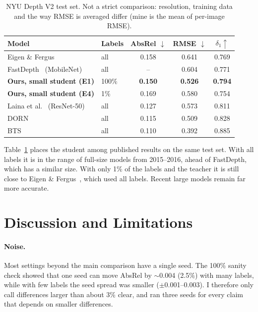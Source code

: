 \documentclass[11pt]{article}
\newcommand{\best}[1]{\textbf{#1}}
\begin{document}
\begin{table}[t]
\centering\small
\begin{tabular}{@{}llccc@{}}
\toprule
Model & Labels & AbsRel $\downarrow$ & RMSE $\downarrow$ & $\delta_1 \uparrow$ \\
\midrule
Eigen \& Fergus~\cite{eigen2015} & all & 0.158 & 0.641 & 0.769 \\
FastDepth~\cite{wofk2019} (MobileNet) & all & -- & 0.604 & 0.771 \\
\best{Ours, small student (E1)} & 100\% & \best{0.150} & \best{0.526} & \best{0.794} \\
\best{Ours, small student (E4)} & 1\% & 0.169 & 0.580 & 0.754 \\
Laina et al.~\cite{laina2016} (ResNet-50) & all & 0.127 & 0.573 & 0.811 \\
DORN~\cite{fu2018} & all & 0.115 & 0.509 & 0.828 \\
BTS~\cite{lee2019} & all & 0.110 & 0.392 & 0.885 \\
\bottomrule
\end{tabular}
\caption{NYU Depth V2 test set. Not a strict comparison: resolution, training data and the way
RMSE is averaged differ (mine is the mean of per-image RMSE).}
\label{tab:published}
\end{table}

Table~\ref{tab:published} places the student among published results on the same test set. With
all labels it is in the range of full-size models from 2015--2016, ahead of FastDepth, which has a
similar size. With only 1\% of the labels and the teacher it is still close to Eigen \&
Fergus~\cite{eigen2015}, which used all labels. Recent large models remain far more accurate.

\section{Discussion and Limitations}

\paragraph{Noise.} Most settings beyond the main comparison have a single seed. The 100\% sanity
check showed that one seed can move AbsRel by $\sim$0.004 (2.5\%) with many labels, while with few
labels the seed spread was smaller ($\pm$0.001--0.003). I therefore only call differences larger
than about 3\% clear, and ran three seeds for every claim that depends on smaller differences.
\end{document}
